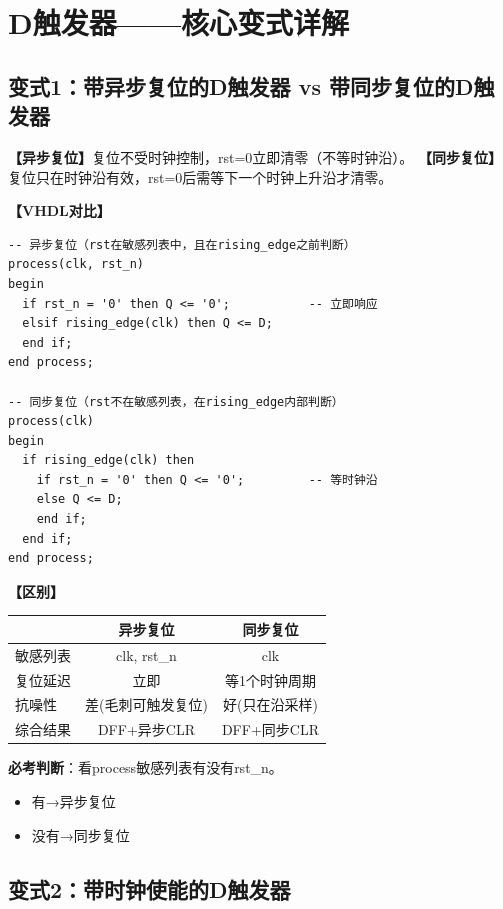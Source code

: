 \chapter{D触发器——核心变式详解}

\section{变式1：带异步复位的D触发器 vs 带同步复位的D触发器}

\begin{detailbox}[完整教学]
\textbf{【异步复位】}复位不受时钟控制，rst=0立即清零（不等时钟沿）。
\textbf{【同步复位】}复位只在时钟沿有效，rst=0后需等下一个时钟上升沿才清零。

\textbf{【VHDL对比】}
\begin{lstlisting}
-- 异步复位（rst在敏感列表中，且在rising_edge之前判断）
process(clk, rst_n)
begin
  if rst_n = '0' then Q <= '0';           -- 立即响应
  elsif rising_edge(clk) then Q <= D;
  end if;
end process;

-- 同步复位（rst不在敏感列表，在rising_edge内部判断）
process(clk)
begin
  if rising_edge(clk) then
    if rst_n = '0' then Q <= '0';         -- 等时钟沿
    else Q <= D;
    end if;
  end if;
end process;
\end{lstlisting}

\textbf{【区别】}
\begin{center}
\begin{tabular}{|l|c|c|}
\hline & 异步复位 & 同步复位 \\
\hline
敏感列表 & clk, rst\_n & clk \\
复位延迟 & 立即 & 等1个时钟周期 \\
抗噪性 & 差(毛刺可触发复位) & 好(只在沿采样) \\
综合结果 & DFF+异步CLR & DFF+同步CLR \\
\hline
\end{tabular}
\end{center}

\begin{examfocus}
\textbf{必考判断}：看process敏感列表有没有rst\_n。
\begin{itemize}
  \item 有→异步复位
  \item 没有→同步复位
\end{itemize}
\end{examfocus}
\end{detailbox}


\section{变式2：带时钟使能的D触发器}

